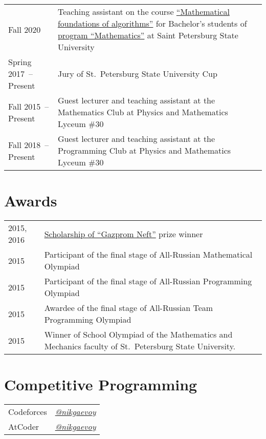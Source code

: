 \documentclass[a4paper, 11pt]{article}
\begin{document}
\begin{tabularx}{\textwidth}{lX}
    Fall 2020 & Teaching assistant on the course \href{https://users.math-cs.spbu.ru/~okhotin/teaching/algorithms_2020/}{``Mathematical foundations of algorithms''} for Bachelor's students of \href{https://math-cs.spbu.ru/en/}{program ``Mathematics''} at Saint Petersburg State University \\

    Spring 2017~-- Present & Jury of St.~Petersburg State University Cup \\

    Fall 2015~-- Present & Guest lecturer and teaching assistant at the Mathematics Club at Physics and Mathematics Lyceum \#30 \\
    
    Fall 2018~-- Present & Guest lecturer and teaching assistant at the Programming Club at Physics and Mathematics Lyceum \#30
\end{tabularx}

\section*{Awards}

\begin{tabularx}{\textwidth}{lX}
    2015, 2016 & \href{https://math-cs.spbu.ru/en/scholarships-rodnye-goroda/}{Scholarship of ``Gazprom Neft''} prize winner \\

    2015 & Participant of the final stage of All-Russian Mathematical Olympiad \\
    
    2015 & Participant of the final stage of All-Russian Programming Olympiad \\
    
    2015 & Awardee of the final stage of All-Russian Team Programming Olympiad \\

    2015 & Winner of School Olympiad of the Mathematics and Mechanics faculty of St.~Petersburg State University.
\end{tabularx}

\section*{Competitive Programming}

\begin{tabular}{ll}
    Codeforces & \href{https://codeforces.com/profile/nikgaevoy}{{\it @nikgaevoy}} \\
    AtCoder & \href{https://atcoder.jp/users/nikgaevoy}{{\it @nikgaevoy}}
\end{tabular}
\end{document}
